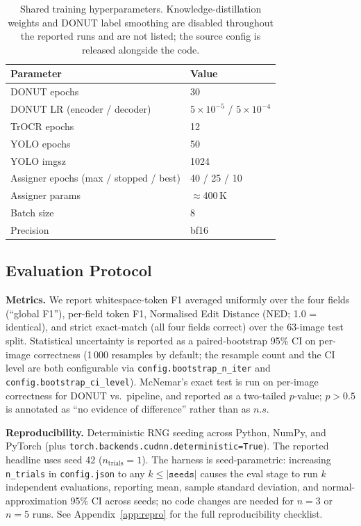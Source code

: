 \documentclass[conference]{IEEEtran}
\begin{document}
\begin{table}[!t]
\centering
\caption{Shared training hyperparameters.  Knowledge-distillation
         weights and DONUT label smoothing are disabled throughout
         the reported runs and are not listed; the source config is
         released alongside the code.}
\label{tab:hparams}
\begin{tabular}{ll}
\toprule
Parameter & Value \\ \midrule
DONUT epochs                           & 30 \\
DONUT LR (encoder / decoder)           & $5{\times}10^{-5}$ / $5{\times}10^{-4}$ \\
TrOCR epochs                           & 12 \\
YOLO epochs                            & 50 \\
YOLO imgsz                             & 1024 \\
Assigner epochs (max / stopped / best) & 40 / 25 / 10 \\
Assigner params                        & $\approx$400\,K \\
Batch size                             & 8 \\
Precision                              & bf16 \\
\bottomrule
\end{tabular}
\end{table}

\subsection{Evaluation Protocol}

\textbf{Metrics.}  We report whitespace-token F1 averaged uniformly
over the four fields (``global F1''), per-field token F1, Normalised
Edit Distance (NED; 1.0 = identical), and strict exact-match (all
four fields correct) over the 63-image test split.  Statistical
uncertainty is reported as a paired-bootstrap 95\% CI on per-image
correctness (1\,000 resamples by default; the resample count and the
CI level are both configurable via \texttt{config.bootstrap\_n\_iter}
and \texttt{config.bootstrap\_ci\_level}).  McNemar's exact test is
run on per-image correctness for DONUT vs.\ pipeline, and reported
as a two-tailed $p$-value; $p>\!0.5$ is annotated as ``no evidence of
difference'' rather than as $n.s.$

\textbf{Reproducibility.}  Deterministic RNG seeding across Python,
NumPy, and PyTorch (plus
\texttt{torch.backends.cudnn.deterministic=True}).  The reported
headline uses seed 42 ($n_{\text{trials}}=1$).  The harness is
seed-parametric: increasing \texttt{n\_trials} in \texttt{config.json}
to any $k\le|\texttt{seeds}|$ causes the eval stage to run $k$
independent evaluations, reporting mean, sample standard deviation,
and normal-approximation 95\% CI across seeds; no code changes are
needed for $n{=}3$ or $n{=}5$ runs.  See
Appendix~\ref{app:repro} for the full reproducibility checklist.
\end{document}
